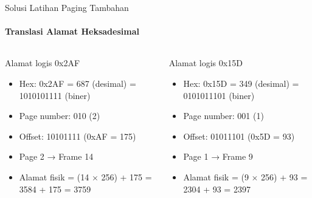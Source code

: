 \documentclass[10pt,aspectratio=169]{beamer}
\begin{document}
\begin{frame}{Solusi Latihan Paging Tambahan}
    \framesubtitle{Translasi Alamat Heksadesimal}
    
    \begin{columns}[T]
            \begin{block}{Alamat logis 0x2AF}
                \begin{itemize}
                    \item Hex: 0x2AF = 687 (desimal) = 1010101111 (biner)
                    \item Page number: 010 (2)
                    \item Offset: 10101111 (0xAF = 175)
                    \item Page 2 → Frame 14
                    \item Alamat fisik = (14 $\times$ 256) + 175 = 3584 + 175 = 3759
                \end{itemize}
            \end{block}
            
            \begin{block}{Alamat logis 0x15D}
                \begin{itemize}
                    \item Hex: 0x15D = 349 (desimal) = 0101011101 (biner)
                    \item Page number: 001 (1)
                    \item Offset: 01011101 (0x5D = 93)
                    \item Page 1 → Frame 9
                    \item Alamat fisik = (9 $\times$ 256) + 93 = 2304 + 93 = 2397
                \end{itemize}
            \end{block}
    \end{columns}
\end{frame}
\end{document}
